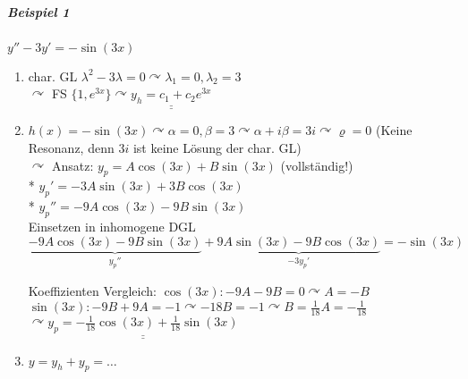 \documentclass[a4paper]{scrartcl}
\begin{document}
\subparagraph{Beispiel 1} $y'' -3y' = - \sin{(3x)}$
\begin{enumerate}
\item char. GL $\lambda^2 -3\lambda = 0 \curvearrowright \lambda_1 = 0, \lambda_2 =3$\\
$\curvearrowright$ FS $\{ 1, e^{3x} \} \curvearrowright \underline{\underline{y_h = c_1 + c_2 e^{3x} }}$
\item $h(x) = - \sin{(3x)} \curvearrowright \alpha = 0, \beta = 3 \curvearrowright \alpha + i \beta = 3i \curvearrowright \varrho = 0$ (Keine Resonanz, denn $3i$ ist keine Lösung der char. GL)\\
$\curvearrowright$ Ansatz: $y_p = A \cos{(3x)} + B \sin{(3x)}$ (vollständig!) \\*
$y_p' = -3A \sin{(3x)} + 3B \cos{(3x)}$\\*
$y_p'' = -9A \cos{(3x)} - 9B \sin{(3x)}$\\

Einsetzen in inhomogene DGL\\
$\underbrace{-9 A\cos{(3x)} - 9B \sin{(3x)}}_{y_p''} + \underbrace{9A \sin{(3x)} - 9B \cos{(3x)}}_{-3y_p'} = - \sin{(3x)}$

Koeffizienten Vergleich: $\cos{(3x)} : -9A -9B = 0 \curvearrowright A=-B$\\
$\sin{(3x)}: -9B + 9A = -1 \curvearrowright -18 B = -1 \curvearrowright B= \frac{1}{18} A= - \frac{1}{18}$\\
$\curvearrowright \underline{\underline{ y_p = - \frac{1}{18} \cos{(3x)} + \frac{1}{18} \sin{(3x)} }}$
\item $y=y_h + y_p = \dots$
\end{enumerate}
\end{document}
